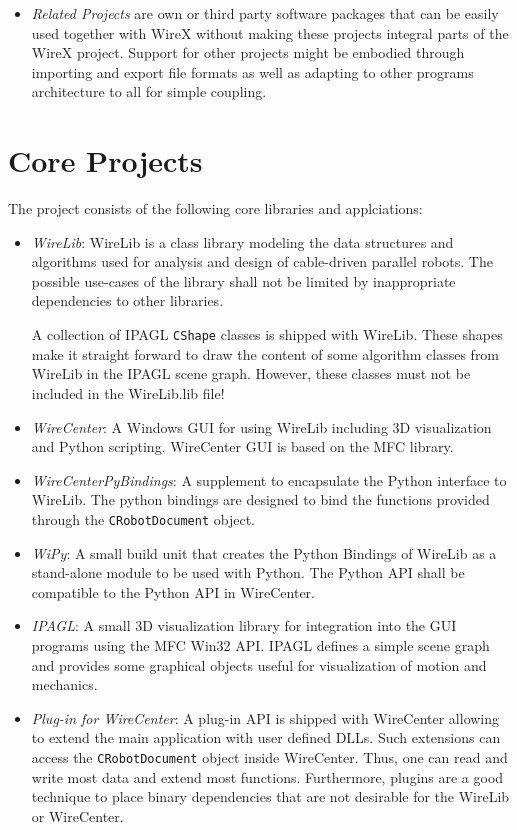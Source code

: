 \documentclass[11pt,a4paper,onepage,openany]{book}
\begin{document}
\begin{itemize}
\item \emph{Related Projects} are own or third party software packages that
    can be easily used together with WireX without making these projects
    integral parts of the WireX project. Support for other projects might be
    embodied through importing and export file formats as well as adapting
    to
    other programs architecture to all for simple coupling.
\end{itemize}

\section{Core Projects}
The project consists of the following core libraries and applciations:
\begin{itemize}
  \item \emph{WireLib}: WireLib is a class library modeling the data
      structures and algorithms used for analysis and design of cable-driven
      parallel robots. The possible use-cases of the library shall not be
      limited by inappropriate dependencies to other libraries.

      A collection of IPAGL \texttt{CShape} classes is shipped with WireLib.
      These shapes make it straight forward to draw the content of some
      algorithm classes from WireLib in the IPAGL scene graph. However, these
      classes must not be included in the WireLib.lib file!

  \item \emph{WireCenter}: A Windows GUI for using WireLib including 3D
      visualization and Python scripting. WireCenter GUI is based on the MFC
      library.

  \item \emph{WireCenterPyBindings}: A supplement to encapsulate the Python
      interface to WireLib. The python bindings are designed to bind the
      functions provided through the \texttt{CRobotDocument} object.

  \item \emph{WiPy}: A small build unit that creates the Python Bindings of
      WireLib as a stand-alone module to be used with Python. The Python API
      shall be compatible to the Python API in WireCenter.

  \item \emph{IPAGL}: A small 3D visualization library for integration into
      the GUI programs using the MFC Win32 API. IPAGL defines a simple scene
      graph and provides some graphical objects useful for visualization of
      motion and mechanics.

  \item \emph{Plug-in for WireCenter}: A plug-in API is shipped with
      WireCenter allowing to extend the main application with user defined
      DLLs. Such extensions can access the \texttt{CRobotDocument} object
      inside WireCenter. Thus, one can read and write most data and extend
      most functions. Furthermore, plugins are a good technique to place
      binary dependencies that are not desirable for the WireLib or
      WireCenter.
\end{itemize}
\end{document}
